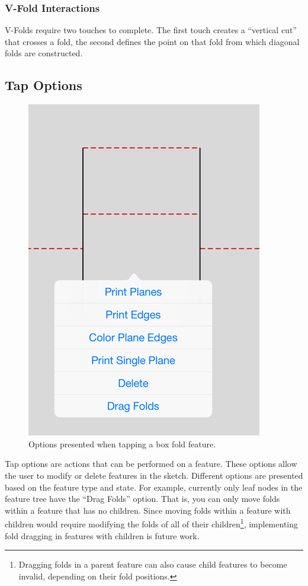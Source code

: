 \subsubsection{V-Fold Interactions}\label{v-fold-interactions}

V-Folds require two touches to complete. The first touch creates a
``vertical cut'' that crosses a fold, the second defines the point on
that fold from which diagonal folds are constructed.

\subsection{Tap Options}\label{tap-options}

\begin{figure}[htbp]
\centering
\includegraphics{figures/32_UI_Tool_Interactions/tap-options.png}
\caption{Options presented when tapping a box fold feature.}
\end{figure}

Tap options are actions that can be performed on a feature. These
options allow the user to modify or delete features in the sketch.
Different options are presented based on the feature type and state. For
example, currently only leaf nodes in the feature tree have the ``Drag
Folds'' option. That is, you can only move folds within a feature that
has no children. Since moving folds within a feature with children would
require modifying the folds of all of their children\footnote{Dragging
  folds in a parent feature can also cause child features to become
  invalid, depending on their fold positions.}, implementing fold
dragging in features with children is future work.

